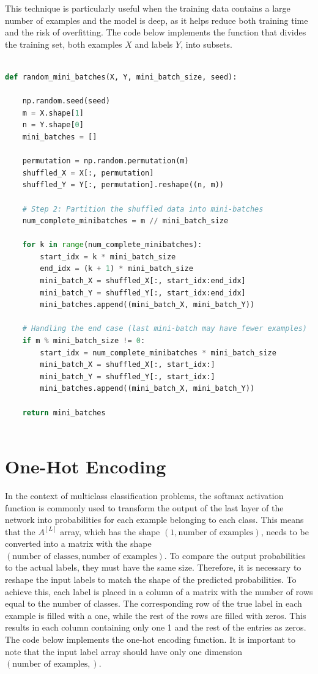 \documentclass[12pt]{article}
\begin{document}
This technique is particularly useful when the training data contains a large number of examples and the model is deep, as it helps reduce both training time and the risk of overfitting. The code below implements the function that divides the training set, both examples $X$ and labels $Y$, into subsets.

\begin{lstlisting}[language=Python, breaklines=true]

def random_mini_batches(X, Y, mini_batch_size, seed):

    np.random.seed(seed)
    m = X.shape[1]
    n = Y.shape[0]
    mini_batches = []

    permutation = np.random.permutation(m)
    shuffled_X = X[:, permutation]
    shuffled_Y = Y[:, permutation].reshape((n, m))

    # Step 2: Partition the shuffled data into mini-batches
    num_complete_minibatches = m // mini_batch_size

    for k in range(num_complete_minibatches):
        start_idx = k * mini_batch_size
        end_idx = (k + 1) * mini_batch_size
        mini_batch_X = shuffled_X[:, start_idx:end_idx]
        mini_batch_Y = shuffled_Y[:, start_idx:end_idx]
        mini_batches.append((mini_batch_X, mini_batch_Y))

    # Handling the end case (last mini-batch may have fewer examples)
    if m % mini_batch_size != 0:
        start_idx = num_complete_minibatches * mini_batch_size
        mini_batch_X = shuffled_X[:, start_idx:]
        mini_batch_Y = shuffled_Y[:, start_idx:]
        mini_batches.append((mini_batch_X, mini_batch_Y))

    return mini_batches
        
\end{lstlisting}

\section*{\large One-Hot Encoding}

In the context of multiclass classification problems, the softmax activation function is commonly used to transform the output of the last layer of the network into probabilities for each example belonging to each class. This means that the $A^{[L]}$ array, which has the shape $\left(1, \text{number of examples}\right)$, needs to be converted into a matrix with the shape $\left(\text{number of classes}, \text{number of examples}\right)$. To compare the output probabilities to the actual labels, they must have the same size. Therefore, it is necessary to reshape the input labels to match the shape of the predicted probabilities. To achieve this, each label is placed in a column of a matrix with the number of rows equal to the number of classes. The corresponding row of the true label in each example is filled with a one, while the rest of the rows are filled with zeros. This results in each column containing only one 1 and the rest of the entries as zeros. The code below implements the one-hot encoding function. It is important to note that the input label array should have only one dimension $\left(\text{number of examples}, \right)$.
\end{document}
